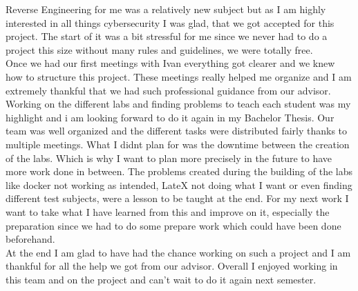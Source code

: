 Reverse Engineering for me was a relatively new subject but as I am highly interested in all things cybersecurity I was glad, that we got accepted for this project. 
The start of it was a bit stressful for me since we never had to do a project this size without many rules and guidelines, we were totally free. \\
Once we had our first meetings with Ivan everything got clearer and we knew how to structure this project. 
These meetings really helped me organize and I am extremely thankful that we had such professional guidance from our advisor. 
Working on the different labs and finding problems to teach each student was my highlight and i am looking forward to do it again in my Bachelor Thesis. 
Our team was well organized and the different tasks were distributed fairly thanks to multiple meetings.  
What I didnt plan for was the downtime between the creation of the labs. Which is why I want to plan more precisely in the future to have more work done in between.
The problems created during the building of the labs like docker not working as intended, LateX not doing what I want or even finding different test subjects, were a lesson to be taught at the end. 
For my next work I want to take what I have learned from this and improve on it, especially the preparation since we had to do some prepare work which could have been done beforehand. \\
At the end I am glad to have had the chance working on such a project and I am thankful for all the help we got from our advisor. 
Overall I enjoyed working in this team and on the project and can't wait to do it again next semester.
